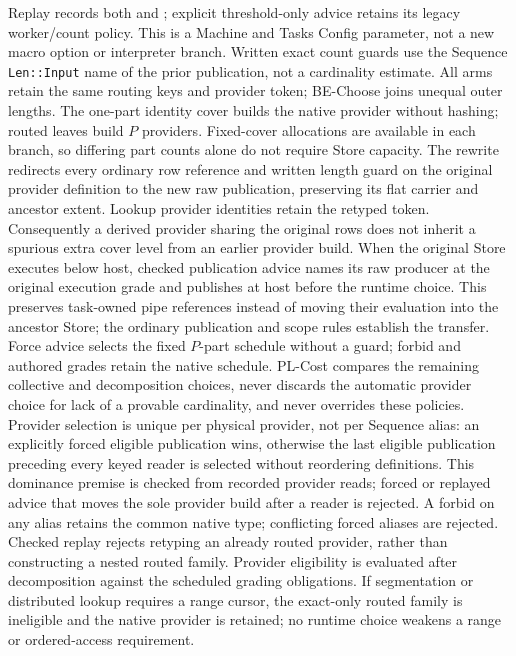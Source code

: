 Replay records both  and ; explicit
threshold-only advice retains its legacy worker/count policy. This is a Machine
and Tasks Config parameter, not a new macro option or interpreter branch.
Written exact count guards use the Sequence \texttt{Len::Input} name of the
prior publication, not a cardinality estimate. All arms retain the same routing
keys and provider token; BE-Choose joins unequal outer lengths. The one-part
identity cover builds the native provider without hashing; routed leaves build
\(P\) providers. Fixed-cover allocations are available in each branch, so
differing part counts alone do not require Store capacity.
The rewrite redirects every ordinary row reference and written length guard
on the original provider definition to the new raw publication, preserving
its flat carrier and ancestor extent. Lookup provider identities retain the
retyped token. Consequently a derived provider sharing the original rows
does not inherit a spurious extra cover level from an earlier provider build.
When the original Store executes below host, checked publication advice names
its raw producer at the original execution grade and publishes
 at host before the runtime choice. This preserves task-owned
pipe references instead of moving their evaluation into the ancestor Store;
the ordinary publication and scope rules establish the transfer.
Force advice selects the fixed $P$-part schedule without a guard; forbid and
authored grades retain the native schedule. PL-Cost compares the remaining
collective and decomposition choices, never discards the automatic provider
choice for lack of a provable cardinality, and never overrides these policies.
Provider selection is unique per physical provider, not per Sequence alias:
an explicitly forced eligible publication wins, otherwise the last eligible
publication preceding every keyed reader is selected without reordering definitions.
This dominance premise is checked from recorded provider reads; forced or replayed
advice that moves the sole provider build after a reader is rejected. A forbid on
any alias retains the common native type; conflicting forced aliases are rejected.
Checked replay rejects retyping an already routed provider, rather than
constructing a nested routed family.
Provider eligibility is evaluated after decomposition against the scheduled
grading obligations. If segmentation or distributed lookup requires a range
cursor, the exact-only routed family is ineligible and the native provider is
retained; no runtime choice weakens a range or ordered-access requirement.
